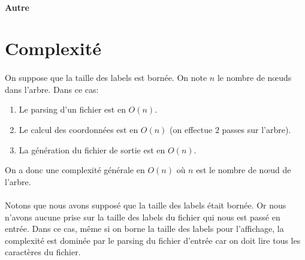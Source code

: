 \paragraph{Autre}

\section{Complexité}

\paragraph{}On suppose que la taille des labels est bornée. On note $n$ le nombre de n\oe uds dans l'arbre. Dans ce cas:

\begin{enumerate}
	\item Le parsing d'un fichier est en $O(n)$.
	\item Le calcul des coordonnées est en $O(n)$ (on effectue $2$ passes sur l'arbre).
	\item La génération du fichier de sortie est en $O(n)$.
\end{enumerate}
On a donc une complexité générale en $O(n)$ où $n$ est le nombre de n\oe ud de l'arbre.

\paragraph{}Notons que nous avons supposé que la taille des labels était bornée. Or nous n'avons aucune prise sur la taille des labels du fichier qui nous est passé en entrée. Dans ce cas, même si on borne la taille des labels pour l'affichage, la complexité est dominée par le parsing du fichier d'entrée car on doit lire tous les caractères du fichier.